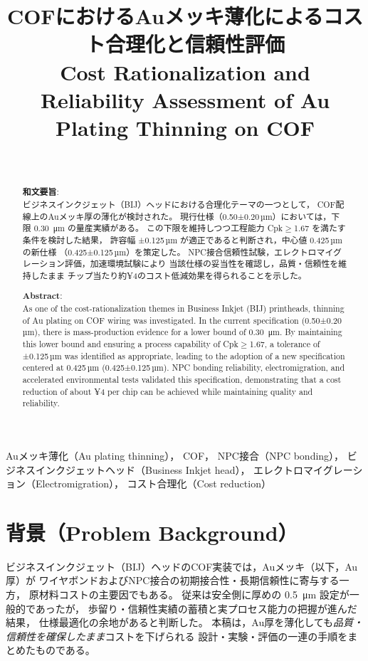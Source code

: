 \documentclass[conference]{IEEEtran}
\title{COFにおけるAuメッキ薄化によるコスト合理化と信頼性評価\\
\large Cost Rationalization and Reliability Assessment of Au Plating Thinning on COF}
\author{%
  \IEEEauthorblockN{三溝 真一（Shinichi Samizo)}\\
  \IEEEauthorblockA{独立系半導体研究者（元セイコーエプソン）\\
  Email: \href{mailto:shin3t72@gmail.com}{shin3t72@gmail.com}\\
  GitHub: \url{https://github.com/Samizo-AITL}}%
}
\begin{document}
\maketitle

\begin{abstract}
\textbf{和文要旨}:\\
ビジネスインクジェット（BIJ）ヘッドにおける合理化テーマの一つとして，
COF配線上のAuメッキ厚の薄化が検討された。
現行仕様（0.50±0.20\,µm）においては，下限 \SI{0.30}{\micro\metre} の量産実績がある。
この下限を維持しつつ工程能力 Cpk$\geq$1.67 を満たす条件を検討した結果，
許容幅 ±0.125\,µm が適正であると判断され，中心値 0.425\,µm の新仕様
（0.425±0.125\,µm）を策定した。
NPC接合信頼性試験，エレクトロマイグレーション評価，加速環境試験により
当該仕様の妥当性を確認し，品質・信頼性を維持したまま
チップ当たり約¥4のコスト低減効果を得られることを示した。

\medskip
\noindent\textbf{Abstract}:\\
As one of the cost-rationalization themes in Business Inkjet (BIJ) printheads,
thinning of Au plating on COF wiring was investigated.
In the current specification (0.50±0.20\,µm), there is mass-production evidence
for a lower bound of \SI{0.30}{\micro\metre}.
By maintaining this lower bound and ensuring a process capability of Cpk$\geq$1.67,
a tolerance of ±0.125\,µm was identified as appropriate,
leading to the adoption of a new specification centered at 0.425\,µm (0.425±0.125\,µm).
NPC bonding reliability, electromigration, and accelerated environmental tests
validated this specification, demonstrating that a cost reduction of about
¥4 per chip can be achieved while maintaining quality and reliability.
\end{abstract}

\begin{IEEEkeywords}
Auメッキ薄化（Au plating thinning），
COF，
NPC接合（NPC bonding），
ビジネスインクジェットヘッド（Business Inkjet head），
エレクトロマイグレーション（Electromigration），
コスト合理化（Cost reduction）
\end{IEEEkeywords}

\section{背景（Problem Background）}
ビジネスインクジェット（BIJ）ヘッドのCOF実装では，Auメッキ（以下，Au厚）が
ワイヤボンドおよびNPC接合の初期接合性・長期信頼性に寄与する一方，
原材料コストの主要因でもある。
従来は安全側に厚めの \SI{0.5}{\micro\meter} 設定が一般的であったが，
歩留り・信頼性実績の蓄積と実プロセス能力の把握が進んだ結果，
仕様最適化の余地があると判断した。
本稿は，Au厚を薄化しても\emph{品質・信頼性を確保したまま}コストを下げられる
設計・実験・評価の一連の手順をまとめたものである。
\end{document}
